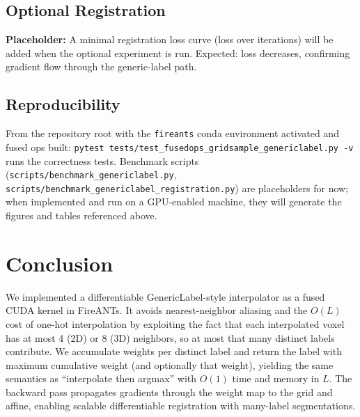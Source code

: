 \documentclass[11pt]{article}
\begin{document}
\subsection{Optional Registration}
\textbf{Placeholder:} A minimal registration loss curve (loss over iterations) will be added when the optional experiment is run. Expected: loss decreases, confirming gradient flow through the generic-label path.

\subsection{Reproducibility}
From the repository root with the \texttt{fireants} conda environment activated and fused ops built: \texttt{pytest tests/test\_fusedops\_gridsample\_genericlabel.py -v} runs the correctness tests. Benchmark scripts (\texttt{scripts/benchmark\_genericlabel.py}, \texttt{scripts/benchmark\_genericlabel\_registration.py}) are placeholders for now; when implemented and run on a GPU-enabled machine, they will generate the figures and tables referenced above.

\section{Conclusion}
\label{sec:conclusion}

We implemented a differentiable GenericLabel-style interpolator as a fused CUDA kernel in FireANTs. It avoids nearest-neighbor aliasing and the $O(L)$ cost of one-hot interpolation by exploiting the fact that each interpolated voxel has at most 4 (2D) or 8 (3D) neighbors, so at most that many distinct labels contribute. We accumulate weights per distinct label and return the label with maximum cumulative weight (and optionally that weight), yielding the same semantics as ``interpolate then argmax'' with $O(1)$ time and memory in $L$. The backward pass propagates gradients through the weight map to the grid and affine, enabling scalable differentiable registration with many-label segmentations.



\end{document}
